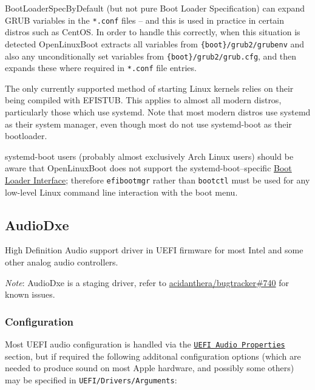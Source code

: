 \documentclass[]{article}
\begin{document}
BootLoaderSpecByDefault (but not pure Boot Loader Specification) can expand GRUB variables
in the \texttt{*.conf} files -- and this is used in practice in certain distros such as CentOS.
In order to handle this correctly, when this situation is detected OpenLinuxBoot extracts all variables from
\texttt{\{boot\}/grub2/grubenv} and also any unconditionally set variables from
\texttt{\{boot\}/grub2/grub.cfg}, and then expands these where required in \texttt{*.conf} file entries.

The only currently supported method of starting Linux kernels relies on their being compiled with EFISTUB.
This applies to almost all modern distros, particularly those which use systemd. Note that most modern
distros use systemd as their system manager, even though most do not use systemd-boot as
their bootloader.

systemd-boot users (probably almost exclusively Arch Linux users) should be aware that OpenLinuxBoot
does not support the systemd-boot--specific \href{https://systemd.io/BOOT\_LOADER\_INTERFACE/}{Boot Loader Interface};
therefore \texttt{efibootmgr} rather than \texttt{bootctl} must be used for any low-level Linux command line interaction
with the boot menu.

\subsection{AudioDxe}\label{uefiaudio}

High Definition Audio support driver in UEFI firmware for most Intel and some other analog audio controllers.

\emph{Note}: AudioDxe is a staging driver, refer to \href{https://github.com/acidanthera/bugtracker/issues/740}{acidanthera/bugtracker\#740}
for known issues.

\subsubsection{Configuration}

Most UEFI audio configuration is handled via the \hyperref[uefiaudioprops]{\texttt{UEFI Audio Properties}}
section, but if required the following additonal configuration options (which are needed to produce sound
on most Apple hardware, and possibly some others) may be specified in \texttt{UEFI/Drivers/Arguments}:
\end{document}

